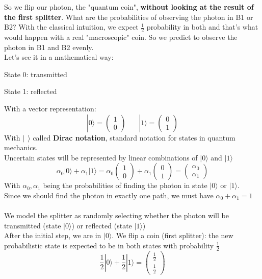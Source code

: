 \documentclass[10pt]{report}
\begin{document}
So we flip our photon, the "quantum coin", \textbf{without looking at the result of the first splitter}. What are the probabilities of observing the photon in B1 or B2? With the classical intuition, we expect $\frac{1}{2}$ probability in both and that's what would happen with a real "macroscopic" coin. So we predict to observe the photon in B1 and B2 evenly.\\
Let's see it in a mathematical way:
\begin{list}{}{}
	\item State 0: transmitted
	\item State 1: reflected
\end{list}
With a vector representation:
$$|0\rangle = \left(\begin{array}{c}
	1\\0
	\end{array}\right)\:\:\:\:\:\:\:\:|1\rangle = \left(\begin{array}{c}
	0\\1
	\end{array}\right)$$
With $|\:\:\rangle$ called \textbf{Dirac notation}, standard notation for states in quantum mechanics.\\
Uncertain states will be represented by linear combinations of $|0\rangle$ and $|1\rangle$
$$\alpha_0|0\rangle + \alpha_1|1\rangle = \alpha_0\left(\begin{array}{c}
1\\0
\end{array}\right) + \alpha_1\left(\begin{array}{c}
0\\1
\end{array}\right) = \left(\begin{array}{c}
\alpha_0\\\alpha_1
\end{array}\right)$$
With $\alpha_0,\alpha_1$ being the probabilities of finding the photon in state $|0\rangle$ or $|1\rangle$.\\
Since we should find the photon in exactly one path, we must have $\alpha_0+\alpha_1=1$\\\\
We model the splitter as randomly selecting whether the photon will be transmitted (state $|0\rangle$) or reflected (state $|1\rangle$)\\
After the initial step, we are in $|0\rangle$. We flip a coin (first splitter): the new probabilistic state is expected to be in both states with probability $\frac{1}{2}$
$$\frac{1}{2}|0\rangle + \frac{1}{2}|1\rangle = \left(\begin{array}{c}
\frac{1}{2}\\\frac{1}{2}
\end{array}\right)$$
\end{document}
